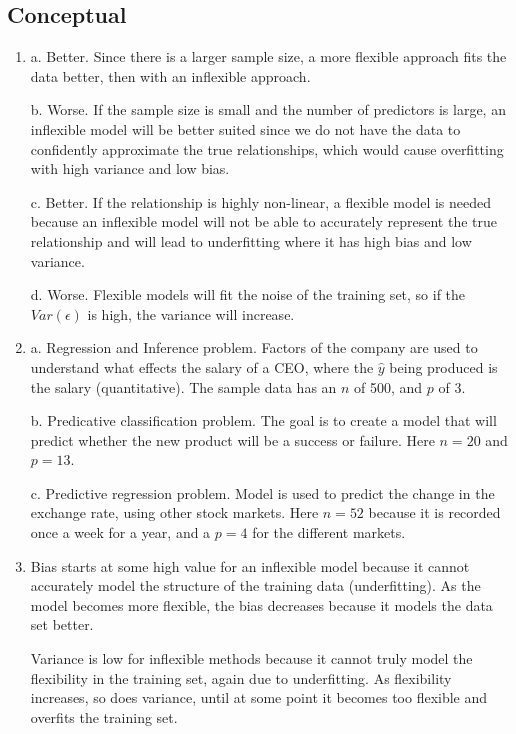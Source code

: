 \documentclass[
]{article}
\author{}
\date{}
\begin{document}
\hypertarget{header-n0}{%
\subsection{Conceptual}\label{header-n0}}

\begin{enumerate}
\def\labelenumi{\arabic{enumi}.}
\item
  a. Better. Since there is a larger sample size, a more flexible
  approach fits the data better, then with an inflexible approach.

  b. Worse. If the sample size is small and the number of predictors is
  large, an inflexible model will be better suited since we do not have
  the data to confidently approximate the true relationships, which
  would cause overfitting with high variance and low bias.

  c. Better. If the relationship is highly non-linear, a flexible model
  is needed because an inflexible model will not be able to accurately
  represent the true relationship and will lead to underfitting where it
  has high bias and low variance.

  d. Worse. Flexible models will fit the noise of the training set, so
  if the \(Var(\epsilon)\) is high, the variance will increase.
\item
  a. Regression and Inference problem. Factors of the company are used
  to understand what effects the salary of a CEO, where the \(\hat{y}\)
  being produced is the salary (quantitative). The sample data has an
  \(n\) of 500, and \(p\) of 3.

  b. Predicative classification problem. The goal is to create a model
  that will predict whether the new product will be a success or
  failure. Here \(n=20\) and \(p=13\).

  c. Predictive regression problem. Model is used to predict the change
  in the exchange rate, using other stock markets. Here \(n=52\) because
  it is recorded once a week for a year, and a \(p=4\) for the different
  markets.
\item
  Bias starts at some high value for an inflexible model because it
  cannot accurately model the structure of the training data
  (underfitting). As the model becomes more flexible, the bias decreases
  because it models the data set better.

  Variance is low for inflexible methods because it cannot truly model
  the flexibility in the training set, again due to underfitting. As
  flexibility increases, so does variance, until at some point it
  becomes too flexible and overfits the training set.


\end{enumerate}
\end{document}
